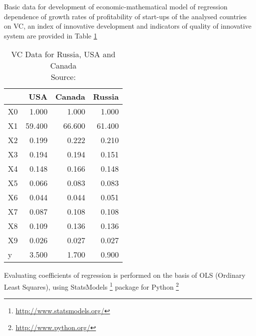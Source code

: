 Basic data for development of economic-mathematical model of regression dependence of growth rates of profitability of start-ups of the analysed countries on VC, an index of innovative development and indicators of quality of innovative system are provided in Table \ref{tab:country_data}


\begin{table}[!htbp]
    \begin{center}
    \begin{tabular}{lrrr}
    \toprule
    {} &     USA &  Canada &  Russia \\
    \midrule
    X0 &   1.000 &   1.000 &   1.000 \\
    X1 &  59.400 &  66.600 &  61.400 \\
    X2 &   0.199 &   0.222 &   0.210 \\
    X3 &   0.194 &   0.194 &   0.151 \\
    X4 &   0.148 &   0.166 &   0.148 \\
    X5 &   0.066 &   0.083 &   0.083 \\
    X6 &   0.044 &   0.044 &   0.051 \\
    X7 &   0.087 &   0.108 &   0.108 \\
    X8 &   0.109 &   0.136 &   0.136 \\
    X9 &   0.026 &   0.027 &   0.027 \\
    y  &   3.500 &   1.700 &   0.900 \\
    \bottomrule
    \end{tabular}
    \caption{VC Data for Russia, USA and Canada \\ Source: \parencite{erawatch}}
    \label{tab:country_data}
    \end{center}
\end{table}

Evaluating coefficients of regression is performed on the basis of OLS (Ordinary Least Squares), using StatsModels \footnote{\url{http://www.statsmodels.org/}} package for Python \footnote{\url{http://www.python.org/}}

\vspace{0.1cm}

